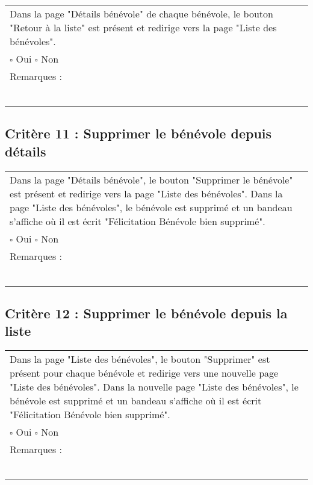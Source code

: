 	\begin{center}
    	 		\begin{tabular}[h]{|p{}|}
			\hline
				Dans la page "Détails bénévole" de chaque bénévole, le bouton "Retour à la liste" est présent et redirige vers la page "Liste des bénévoles".\\
				$\square$ Oui  \hfill \hfill $\square$ Non \\\hline Remarques : \\ ~\\
			 \\\hline
     		\end{tabular}
  		\end{center}	
  		
  		
  		\subsection*{Critère 11 : Supprimer le bénévole depuis détails}
	
	\begin{center}
    	 		\begin{tabular}[h]{|p{}|}
			\hline
				Dans la page "Détails bénévole", le bouton "Supprimer le bénévole" est présent et redirige vers la page "Liste des bénévoles". Dans la page "Liste des bénévoles", le bénévole est supprimé et un bandeau s'affiche où il est écrit "Félicitation Bénévole bien supprimé".\\
				$\square$ Oui  \hfill \hfill $\square$ Non \\\hline Remarques : \\ ~\\
			 \\\hline
     		\end{tabular}
  		\end{center}
  		
  		
  		
  			\subsection*{Critère 12 : Supprimer le bénévole depuis la liste}
	
	\begin{center}
    	 		\begin{tabular}[h]{|p{}|}
			\hline
				Dans la page "Liste des bénévoles", le bouton "Supprimer" est présent pour chaque bénévole et redirige vers une nouvelle page "Liste des bénévoles". Dans la nouvelle page "Liste des bénévoles", le bénévole est supprimé et un bandeau s'affiche où il est écrit "Félicitation Bénévole bien supprimé".\\
				$\square$ Oui  \hfill \hfill $\square$ Non \\\hline Remarques : \\ ~\\
			 \\\hline
     		\end{tabular}
  		\end{center}

